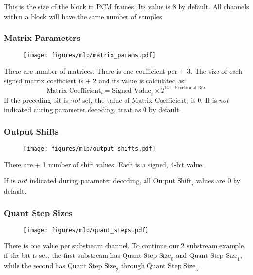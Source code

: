 This is the size of the block in PCM frames.
Its value is 8 by default.
All channels within a block will have the same number of samples.

\clearpage

\subsubsection{Matrix Parameters}


\begin{figure}[h]
\texttt{[image: figures/mlp/matrix\_params.pdf]}
\end{figure}
\par
\noindent
There are  number of matrices.
There is one coefficient per  + 3.
The size of each signed matrix coefficient is  + 2
and its value is calculated as:
\begin{equation*}
\text{Matrix Coefficient}_i = \text{Signed Value}_i \times 2 ^ {14 - \text{Fractional Bits}}
\end{equation*}
If the preceding  bit is \textit{not} set,
the value of $\text{Matrix Coefficient}_i$ is 0.
If  is \textit{not} indicated during parameter decoding,
treat  as 0 by default.

\subsubsection{Output Shifts}


\begin{figure}[h]
\texttt{[image: figures/mlp/output\_shifts.pdf]}
\end{figure}
\par
\noindent
There are  + 1 number of shift values.
Each is a signed, 4-bit value.
\par
If  is \textit{not} indicated during parameter
decoding, all $\text{Output Shift}_i$ values are 0 by default.


\subsubsection{Quant Step Sizes}

\begin{figure}[h]
\texttt{[image: figures/mlp/quant\_steps.pdf]}
\end{figure}
\par
\noindent
There is one  value per substream channel.
To continue our 2 substream example, if the  bit is set,
the first substream has $\text{Quant Step Size}_0$ and
$\text{Quant Step Size}_1$,
while the second has $\text{Quant Step Size}_2$ through
$\text{Quant Step Size}_5$.

